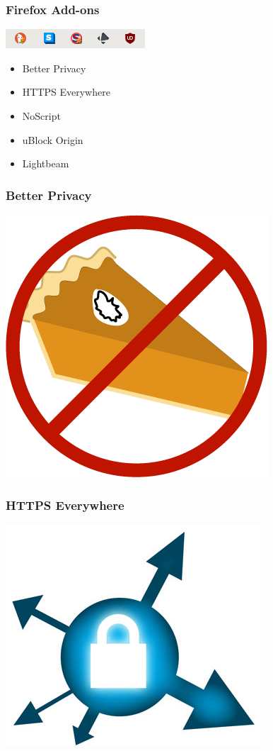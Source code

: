 
  \begin{frame}
    \frametitle{Firefox Add-ons}
    \includegraphics{img/plugins.png}
    \begin{itemize}
      \item Better Privacy
      \item HTTPS Everywhere
      \item NoScript
      \item uBlock Origin
      \item Lightbeam
    \end{itemize}
  \end{frame}

  \begin{frame}
    \frametitle{Better Privacy}
    \includegraphics[height=0.7\textheight]{img/better_privacy.png}
  \end{frame}

  \begin{frame}
    \frametitle{HTTPS Everywhere}
    \includegraphics[height=0.7\textheight]{img/https_everywhere.png}
  \end{frame}

